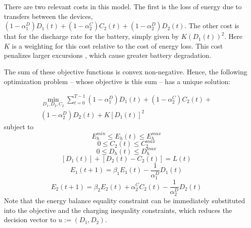 \documentclass[conference]{IEEEtran}
\begin{document}
There are two relevant costs in this model. The first is the loss of energy due to transfers between the devices, $(1-\alpha_{1}^{D})D_{1}(t)+(1-\alpha_{2}^{C})C_{2}(t)+(1-\alpha_{2}^{D})D_{2}(t)$. The other cost is that for the discharge rate for the battery, simply given by $K(D_{1}(t))^{2}$. Here $K$ is a weighting for this cost relative to the cost of energy loss. This cost penalizes larger excursions \cite{bambang2014energy}, which cause greater battery degradation.

The sum of these objective functions is convex non-negative. Hence, the following optimization problem -- whose objective is this sum -- has a unique solution:

\begin{multline} \label{eq:initCostFnc}
    \min_{D_{1},D_{2},C_{2}} \sum_{t=0}^{T-1}
	(1-\alpha_{1}^{D})D_{1}(t)+
	(1-\alpha_{2}^{C})C_{2}(t)+\\
	(1-\alpha_{2}^{D})D_{2}(t)+
	K\left[D_{1}(t)\right]^{2}
\end{multline}
subject to
\begin{displaymath}E_{h}^{min}\leq E_{h}(t)\leq E_{h}^{max}\end{displaymath}
\begin{displaymath}0\leq C_{2}(t)\leq C_{2}^{max}\end{displaymath}
\begin{displaymath}0\leq D_{h}(t)\leq D_{h}^{max}\end{displaymath}
\begin{displaymath}\left[D_{1}(t)\right] + \left[D_{2}(t) - C_{2}(t)\right] = L(t)\end{displaymath}
\begin{displaymath}E_{1}(t+1)=\beta_{1}E_{1}(t)-\frac{1}{\alpha_{1}^{D}}D_{1}(t)\end{displaymath}
\begin{displaymath}E_{2}(t+1)=\beta_{2}E_{2}(t)+\alpha_{2}^{C}C_{2}(t)-\frac{1}{\alpha_{2}^{D}}D_{2}(t)\end{displaymath} Note that the energy balance equality constraint can be immediately substituted into the objective and the charging inequality constraints, which reduces the decision vector to $u:=(D_{1},D_{2})$. %

\end{document}
